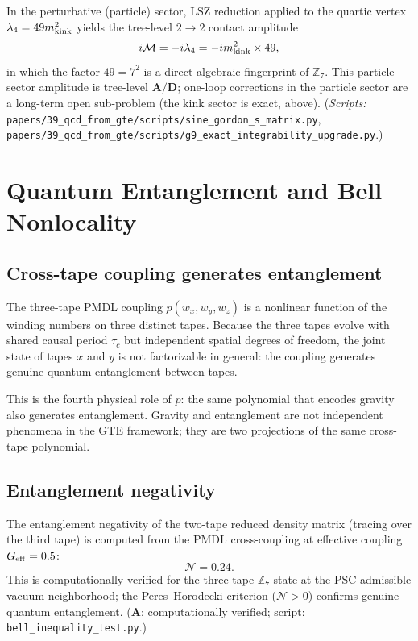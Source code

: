 \documentclass[11pt]{article}
\theoremstyle{remark}
\newcommand{\ZS}{\mathbb{Z}_7}
\newcommand{\CatA}{\textbf{A}}
\newcommand{\CatAD}{\textbf{A/D}}
\begin{document}
In the perturbative (particle) sector, LSZ reduction applied to the quartic vertex
$\lambda_4 = 49 m_{\rm kink}^2$ yields the tree-level $2\to 2$ contact amplitude
\[
  i\mathcal{M} = -i\lambda_4 = -i m_{\rm kink}^2 \times 49,
\]
in which the factor $49 = 7^2$ is a direct algebraic fingerprint of $\mathbb{Z}_7$.
This particle-sector amplitude is tree-level $\CatAD$; one-loop corrections in the
particle sector are a long-term open sub-problem (the kink sector is exact, above).
(\textit{Scripts:} \texttt{papers/39\_qcd\_from\_gte/scripts/sine\_gordon\_s\_matrix.py},
\texttt{papers/39\_qcd\_from\_gte/scripts/g9\_exact\_integrability\_upgrade.py}.)

\section{Quantum Entanglement and Bell Nonlocality}
\label{sec:entanglement}

\subsection{Cross-tape coupling generates entanglement}
\label{ssec:entangle_gen}

The three-tape PMDL coupling $p(w_x,w_y,w_z)$ is a nonlinear function of the
winding numbers on three distinct tapes. Because the three tapes evolve with
shared causal period $\tau_c$ but independent spatial degrees of freedom, the
joint state of tapes $x$ and $y$ is not factorizable in general: the coupling
generates genuine quantum entanglement between tapes.

This is the fourth physical role of $p$: the same polynomial that encodes
gravity also generates entanglement. Gravity and entanglement are not independent
phenomena in the GTE framework; they are two projections of the same cross-tape
polynomial.

\subsection{Entanglement negativity}
\label{ssec:negativity}

The entanglement negativity of the two-tape reduced density matrix (tracing over
the third tape) is computed from the PMDL cross-coupling at effective coupling
$G_{\rm eff} = 0.5$:
\[
  \mathcal{N} = 0.24.
\]
This is computationally verified for the three-tape $\ZS$ state at the
PSC-admissible vacuum neighborhood; the Peres--Horodecki criterion ($\mathcal{N}>0$)
confirms genuine quantum entanglement.
($\CatA$; computationally verified; script: \texttt{bell\_inequality\_test.py}.)
\end{document}
